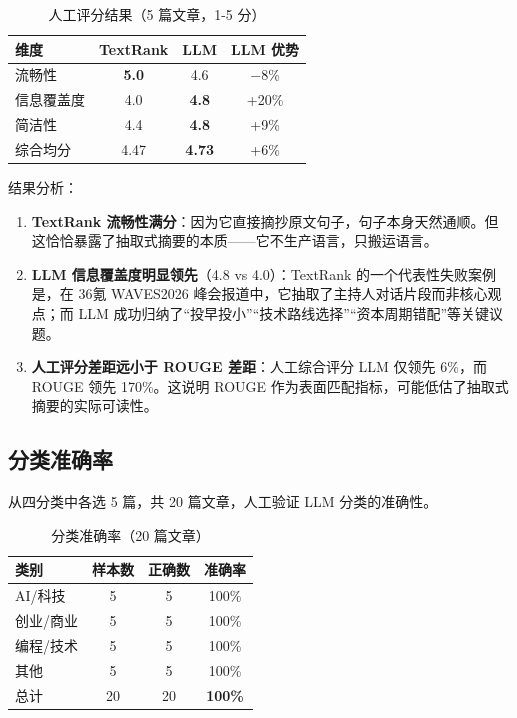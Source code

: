 \documentclass[12pt,a4paper]{ctexart}
\begin{document}
\begin{table}[H]
\centering
\caption{人工评分结果（5 篇文章，1-5 分）}
\label{tab:human}
\begin{tabular}{lccc}
\toprule
\textbf{维度} & \textbf{TextRank} & \textbf{LLM} & \textbf{LLM 优势} \\
\midrule
流畅性     & \textbf{5.0} & 4.6 & $-$8\% \\
信息覆盖度 & 4.0 & \textbf{4.8} & +20\% \\
简洁性     & 4.4 & \textbf{4.8} & +9\% \\
\midrule
综合均分   & 4.47 & \textbf{4.73} & +6\% \\
\bottomrule
\end{tabular}
\end{table}

结果分析：

\begin{enumerate}[label=(\arabic*),nosep]
    \item \textbf{TextRank 流畅性满分}：因为它直接摘抄原文句子，句子本身天然通顺。但这恰恰暴露了抽取式摘要的本质——它不生产语言，只搬运语言。
    \item \textbf{LLM 信息覆盖度明显领先}（4.8 vs 4.0）：TextRank 的一个代表性失败案例是，在 36氪 WAVES2026 峰会报道中，它抽取了主持人对话片段而非核心观点；而 LLM 成功归纳了“投早投小”“技术路线选择”“资本周期错配”等关键议题。
    \item \textbf{人工评分差距远小于 ROUGE 差距}：人工综合评分 LLM 仅领先 6\%，而 ROUGE 领先 170\%。这说明 ROUGE 作为表面匹配指标，可能低估了抽取式摘要的实际可读性。
\end{enumerate}

\subsection{分类准确率}

从四分类中各选 5 篇，共 20 篇文章，人工验证 LLM 分类的准确性。

\begin{table}[H]
\centering
\caption{分类准确率（20 篇文章）}
\label{tab:category}
\begin{tabular}{lccc}
\toprule
\textbf{类别} & \textbf{样本数} & \textbf{正确数} & \textbf{准确率} \\
\midrule
AI/科技   & 5 & 5 & 100\% \\
创业/商业 & 5 & 5 & 100\% \\
编程/技术 & 5 & 5 & 100\% \\
其他      & 5 & 5 & 100\% \\
\midrule
总计      & 20 & 20 & \textbf{100\%} \\
\bottomrule
\end{tabular}
\end{table}
\end{document}

